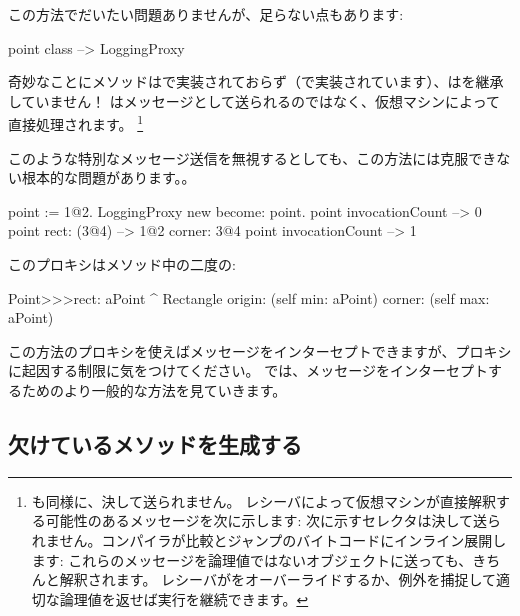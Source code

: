 \documentclass[a4paper,10pt,twoside]{book}
\begin{document}
この方法でだいたい問題ありませんが、足らない点もあります:
\begin{code}{}
point class --> LoggingProxy
\end{code}
奇妙なことにメソッドはで実装されておらず（で実装されています）、はを継承していません！
はメッセージとして送られるのではなく、仮想マシンによって直接処理されます。
\footnote{も同様に、決して送られません。
レシーバによって仮想マシンが直接解釈する可能性のあるメッセージを次に示します:
\ct{+- < > <= >= = ~= * / \ ==}
次に示すセレクタは決して送られません。コンパイラが比較とジャンプのバイトコードにインライン展開します:
これらのメッセージを論理値ではないオブジェクトに送っても、きちんと解釈されます。
レシーバがをオーバーライドするか、例外を捕捉して適切な論理値を返せば実行を継続できます。
}%

このような特別なメッセージ送信を無視するとしても、この方法には克服できない根本的な問題があります。。
\begin{code}{}
point := 1@2.
LoggingProxy new become: point.
point invocationCount --> 0
point rect: (3@4)        --> 1@2 corner: 3@4
point invocationCount --> 1
\end{code}

このプロキシはメソッド中の二度の:
\begin{code}{}
Point>>>rect: aPoint 
	^ Rectangle  origin: (self min: aPoint) corner: (self max: aPoint)
\end{code}

この方法のプロキシを使えばメッセージをインターセプトできますが、プロキシに起因する制限に気をつけてください。
では、メッセージをインターセプトするためのより一般的な方法を見ていきます。

\subsection{欠けているメソッドを生成する}
\end{document}
